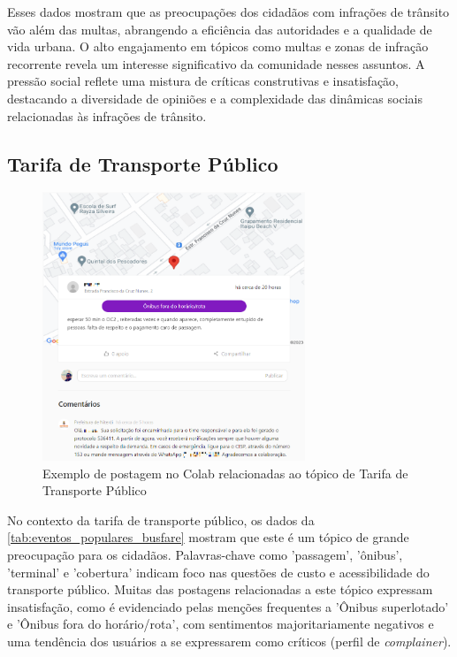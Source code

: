 Esses dados mostram que as preocupações dos cidadãos com infrações de trânsito vão além das multas, abrangendo a eficiência das autoridades e a qualidade de vida urbana. O alto engajamento em tópicos como multas e zonas de infração recorrente revela um interesse significativo da comunidade nesses assuntos. A pressão social reflete uma mistura de críticas construtivas e insatisfação, destacando a diversidade de opiniões e a complexidade das dinâmicas sociais relacionadas às infrações de trânsito.

\subsection{Tarifa de Transporte Público}
\label{sec:eventos_populares_busfare}

\begin{figure}[htb]
	\centering
	\includegraphics[width=0.7\textwidth]{images/colab_posts_busfare.png}
	\caption{Exemplo de postagem no Colab relacionadas ao tópico de Tarifa de Transporte Público}
	\label{fig:colab_posts_busfare}
\end{figure}

No contexto da tarifa de transporte público, os dados da \autoref{tab:eventos_populares_busfare} mostram que este é um tópico de grande preocupação para os cidadãos. Palavras-chave como 'passagem', 'ônibus', 'terminal' e 'cobertura' indicam foco nas questões de custo e acessibilidade do transporte público. Muitas das postagens relacionadas a este tópico expressam insatisfação, como é evidenciado pelas menções frequentes a 'Ônibus superlotado' e 'Ônibus fora do horário/rota', com sentimentos majoritariamente negativos e uma tendência dos usuários a se expressarem como críticos (perfil de \textit{complainer}).


